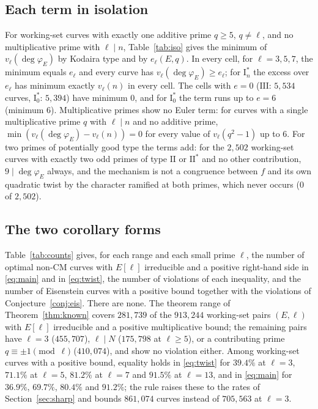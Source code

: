 \documentclass[11pt]{amsart}
\theoremstyle{definition}
\newcommand{\degphi}{\deg\varphi_E}
\begin{document}
\subsection{Each term in isolation}\label{sec:iso}
For working-set curves with exactly one additive prime $q\ge5$, $q\ne\ell$, and no multiplicative prime with $\ell\mid n$, Table~\ref{tab:iso} gives the minimum of $v_\ell(\degphi)$ by Kodaira type and by $e_\ell(E,q)$. In every cell, for $\ell=3,5,7$, the minimum equals $e_\ell$ and every curve has $v_\ell(\degphi)\ge e_\ell$; for $\mathrm{I}_n^*$ the excess over $e_\ell$ has minimum exactly $v_\ell(n)$ in every cell. The cells with $e=0$ ($\mathrm{III}$: $5{,}534$ curves, $\mathrm{I}_0^*$: $5{,}394$) have minimum $0$, and for $\mathrm{I}_0^*$ the term runs up to $e=6$ (minimum $6$). Multiplicative primes show no Euler term: for curves with a single multiplicative prime $q$ with $\ell\mid n$ and no additive prime, $\min(v_\ell(\degphi)-v_\ell(n))=0$ for every value of $v_\ell(q^2-1)$ up to $6$. For two primes of potentially good type the terms add: for the $2{,}502$ working-set curves with exactly two odd primes of type $\mathrm{II}$ or $\mathrm{II}^*$ and no other contribution, $9\mid\degphi$ always, and the mechanism is not a congruence between $f$ and its own quadratic twist by the character ramified at both primes, which never occurs ($0$ of $2{,}502$).

\begin{table}[ht]\centering\footnotesize

\caption{Working set, $\ell=3$: minimum of $v_3(\degphi)$ (number of curves) over curves with $E[3]$ irreducible whose only additive prime is a single $q\ge5$ of the given type with $e_3(E,q)=e$, and no multiplicative $3$-contribution. The same holds at $\ell=5$ and $7$.}\label{tab:iso}
\end{table}

\subsection{The two corollary forms}\label{sec:forms}
Table~\ref{tab:counts} gives, for each range and each small prime $\ell$, the number of optimal non-CM curves with $E[\ell]$ irreducible and a positive right-hand side in \eqref{eq:main} and in \eqref{eq:twist}, the number of violations of each inequality, and the number of Eisenstein curves with a positive bound together with the violations of Conjecture~\ref{conj:eis}. There are none. The theorem range of Theorem~\ref{thm:known} covers $281{,}739$ of the $913{,}244$ working-set pairs $(E,\ell)$ with $E[\ell]$ irreducible and a positive multiplicative bound; the remaining pairs have $\ell=3$ ($455{,}707$), $\ell\mid N$ ($175{,}798$ at $\ell\ge5$), or a contributing prime $q\equiv\pm1\pmod\ell$ ($410{,}074$), and show no violation either. Among working-set curves with a positive bound, equality holds in \eqref{eq:twist} for $39.4\%$ at $\ell=3$, $71.1\%$ at $\ell=5$, $81.2\%$ at $\ell=7$ and $91.5\%$ at $\ell=13$, and in \eqref{eq:main} for $36.9\%$, $69.7\%$, $80.4\%$ and $91.2\%$; the rule raises these to the rates of Section~\ref{sec:sharp} and bounds $861{,}074$ curves instead of $705{,}563$ at $\ell=3$.
\end{document}
